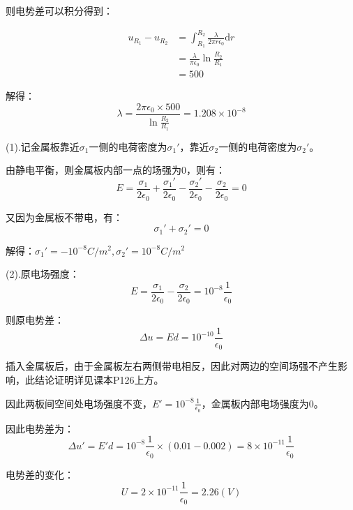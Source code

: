 \documentclass[b5paper,opensource,sourcefont,parskip]{qyxf-book}
\newcommand{\di}[1]{\mathrm{d}#1}
\begin{document}
则电势差可以积分得到：

\begin{align*}
u_{R_1}-u_{R_2}&=\int_{R_1}^{R_2} \frac{\lambda}{2\pi r\epsilon_0} \di{r}\\
&=\frac{\lambda}{\pi\epsilon_0}\ln\frac{R_2}{R_1}\\
&=500
\end{align*}


解得：
\[\lambda=\frac{2\pi\epsilon_0\times 500}{\ln\frac{R_2}{R_1}}=1.208\times 10^{-8}\]


\solve 
(1).记金属板靠近$ \sigma_1 $一侧的电荷密度为$ \sigma_1' $，靠近$ \sigma_2 $一侧的电荷密度为$ \sigma_2' $。

由静电平衡，则金属板内部一点的场强为$ 0 $，则有：
\[E=\frac{\sigma_1}{2\epsilon_0}+\frac{\sigma_1'}{2\epsilon_0}-\frac{\sigma_2'}{2\epsilon_0}-\frac{\sigma_2}{2\epsilon_0}=0\]

又因为金属板不带电，有：
\[\sigma_1'+\sigma_2'=0\]

解得：$\sigma_1'=-10^{-8}C/m^2,\sigma_2'=10^{-8}C/m^2$

(2).原电场强度：
\[E=\frac{\sigma_1}{2\epsilon_0}-\frac{\sigma_2}{2\epsilon_0}=10^{-8}\frac{1}{\epsilon_0}\]

则原电势差：
\[\Delta u=Ed=10^{-10}\frac{1}{\epsilon_0}\]

插入金属板后，由于金属板左右两侧带电相反，因此对两边的空间场强不产生影响，此结论证明详见课本P126上方。

因此两板间空间处电场强度不变，$ E'=10^{-8}\frac{1}{\epsilon_0} $，金属板内部电场强度为$ 0 $。

因此电势差为：
\[\Delta u'=E'd=10^{-8}\frac{1}{\epsilon_0}\times(0.01-0.002)=8\times 10^{-11}\frac{1}{\epsilon_0}\]

电势差的变化：
\[U=2\times10^{-11}\frac{1}{\epsilon_0}=2.26(V)\]
\end{document}
